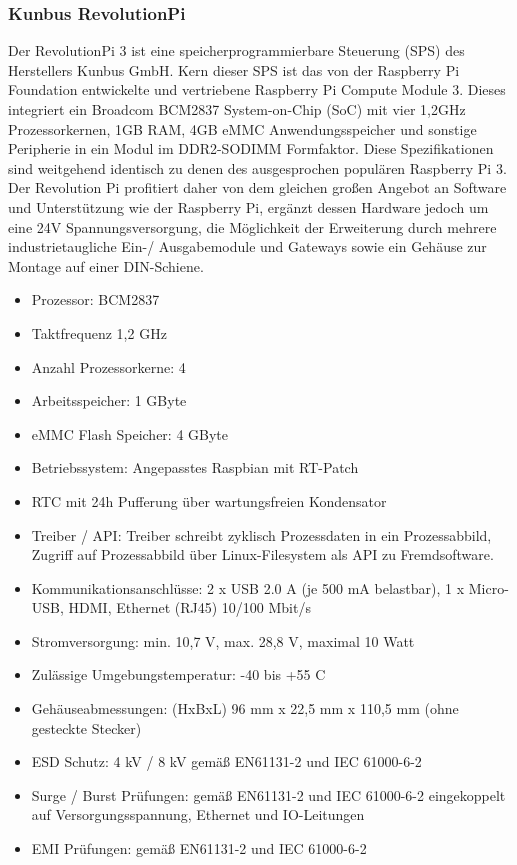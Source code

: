 \subsubsection{Kunbus RevolutionPi%
        \label{sec:2-revpi}}
Der RevolutionPi 3 ist eine speicherprogrammierbare Steuerung (SPS) des Herstellers
Kunbus GmbH. Kern dieser SPS ist das von der Raspberry Pi Foundation entwickelte
und vertriebene Raspberry Pi Compute Module 3. Dieses integriert ein Broadcom BCM2837
System-on-Chip (SoC) mit vier 1,2GHz Prozessorkernen, 1GB RAM, 4GB eMMC Anwendungsspeicher
und sonstige Peripherie in ein Modul im DDR2-SODIMM Formfaktor. Diese Spezifikationen
sind weitgehend identisch zu denen des ausgesprochen populären Raspberry Pi 3.
Der Revolution Pi profitiert daher von dem gleichen großen Angebot an Software
und Unterstützung wie der Raspberry Pi, ergänzt dessen Hardware jedoch um eine 24V
Spannungsversorgung, die Möglichkeit der Erweiterung durch mehrere industrietaugliche
Ein-/ Ausgabemodule und Gateways sowie ein Gehäuse zur Montage auf einer DIN-Schiene.
\begin{itemize}
  \item{Prozessor: BCM2837}
  \item{Taktfrequenz 1,2 GHz}
  \item{Anzahl Prozessorkerne: 4}
  \item{Arbeitsspeicher: 1 GByte}
  \item{eMMC Flash Speicher: 4 GByte}
  \item{Betriebssystem: Angepasstes Raspbian mit RT-Patch}
  \item{RTC mit 24h Pufferung über wartungsfreien Kondensator}
  \item{Treiber / API: Treiber schreibt zyklisch Prozessdaten in ein Prozessabbild, Zugriff auf Prozessabbild über Linux-Filesystem als API zu Fremdsoftware.}
  \item{Kommunikationsanschlüsse: 2 x USB 2.0 A (je 500 mA belastbar), 1 x Micro-USB, HDMI, Ethernet (RJ45) 10/100 Mbit/s}
  \item{Stromversorgung: min. 10,7 V, max. 28,8 V, maximal 10 Watt}
  \item{Zulässige Umgebungstemperatur: -40 bis +55 C}
  \item{Gehäuseabmessungen: (HxBxL) 96 mm x 22,5 mm x 110,5 mm (ohne gesteckte Stecker)}
  \item{ESD Schutz: 4 kV / 8 kV gemäß EN61131-2 und IEC 61000-6-2}
  \item{Surge / Burst Prüfungen: gemäß EN61131-2 und IEC 61000-6-2 eingekoppelt auf Versorgungsspannung, Ethernet und IO-Leitungen}
  \item{EMI Prüfungen: gemäß EN61131-2 und IEC 61000-6-2}
\end{itemize}

